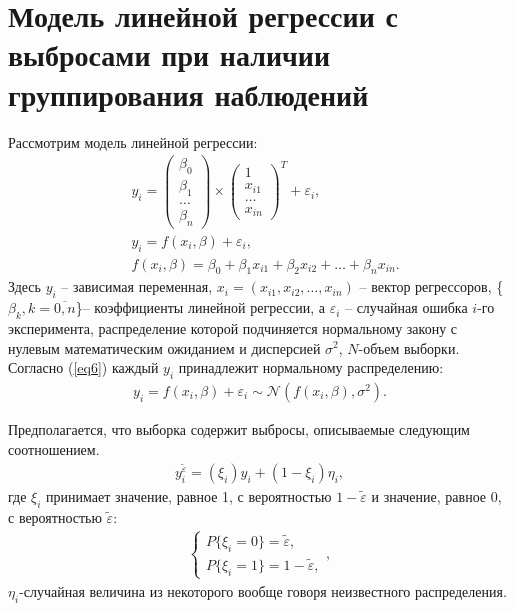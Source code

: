 \section{Модель линейной регрессии с выбросами при наличии группирования наблюдений}
Рассмотрим модель линейной регрессии:
\begin{eqnarray}
    &\label{eq2}y_i= 
    \begin{pmatrix}
        \beta_0\\
        \beta_1\\
        \dots\\
        \beta_n
    \end{pmatrix}\times
    \begin{pmatrix}
        1\\
        x_{i1}\\
        \dots\\
        x_{in}
    \end{pmatrix}^{T}+ \varepsilon_i,\\
    &\label{eq6}y_i= f(x_i,\beta)+\varepsilon_i,\\
    &f(x_i,\beta)=\beta_0+\beta_1 x_{i1}+\beta_2 x_{i2}+\dots+\beta_n x_{in}.
\end{eqnarray}
Здесь $y_i$ -- зависимая переменная, $x_i=(x_{i1},x_{i2},\dots,x_{in})$ -- вектор регрессоров, \{$\beta_k, k=\overline{0,n}$\}-- коэффициенты линейной регрессии, а $\varepsilon_i$ -- случайная ошибка $i$-го эксперимента, распределение которой подчиняется нормальному закону с нулевым математическим ожиданием и дисперсией $\sigma^2$, $N$-объем выборки.
Согласно (\ref{eq6}) каждый $y_i$ принадлежит нормальному распределению:
\begin{eqnarray}
    \label{eq12} y_i=f(x_i,\beta)+\varepsilon_i \sim \mathcal{N}(f(x_i,\beta),\sigma^2).
\end{eqnarray}

Предполагается, что выборка содержит выбросы, описываемые следующим соотношением.
\begin{eqnarray}
    \label{eq3}y_i^{\widetilde{\varepsilon}}=(\xi_i)y_i+ (1-\xi_i)\eta_i,
\end{eqnarray}
где $\xi_i$ принимает значение, равное 1, с вероятностью $1-\widetilde{\varepsilon}$ и значение, равное 0, с вероятностью $\widetilde{\varepsilon}$:
\begin{eqnarray}\label{eq4}
    \begin{cases}
        P\{\xi_i=0\}=\widetilde{\varepsilon},\\
        P\{\xi_i=1\}=1-\widetilde{\varepsilon},
    \end{cases},
\end{eqnarray}
$\eta_i$-случайная величина из некоторого вообще говоря неизвестного распределения.

